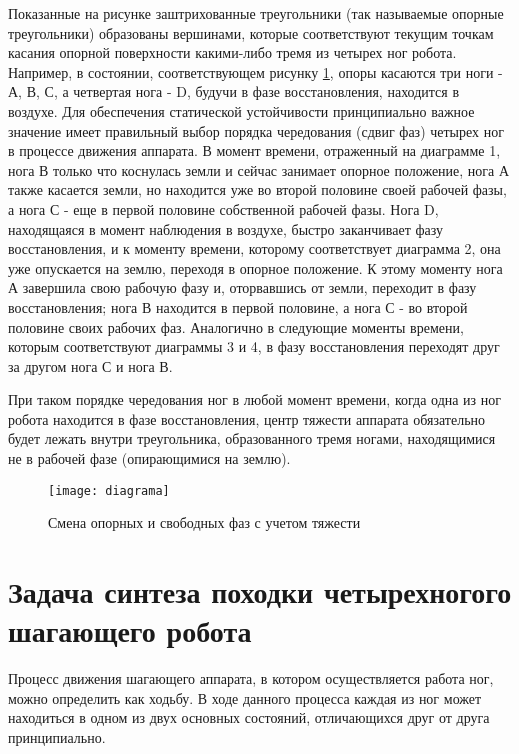 Показанные на рисунке заштрихованные треугольники (так называемые опорные треугольники) образованы вершинами, которые соответствуют текущим точкам касания опорной поверхности какими-либо тремя из четырех ног робота. Например, в состоянии, соответствующем рисунку \ref{diagrama}, опоры касаются три ноги - А, В, С, а четвертая нога - D, будучи в фазе восстановления, находится в воздухе. Для обеспечения статической устойчивости принципиально важное значение имеет правильный выбор порядка чередования (сдвиг фаз) четырех ног в процессе движения аппарата. В момент времени, отраженный на диаграмме 1, нога В только что коснулась земли и сейчас занимает опорное положение, нога А также касается земли, но находится уже во второй половине своей рабочей фазы, а нога С - еще в первой половине собственной рабочей фазы. Нога D, находящаяся в момент наблюдения в воздухе, быстро заканчивает фазу восстановления, и к моменту времени, которому соответствует диаграмма 2, она уже опускается на землю, переходя в опорное положение. К этому моменту нога А завершила свою рабочую фазу и, оторвавшись от земли, переходит в фазу восстановления; нога В находится в первой половине, а нога С - во второй половине своих рабочих фаз. Аналогично в следующие моменты времени, которым соответствуют диаграммы 3 и 4, в фазу восстановления переходят друг за другом нога С и нога В. 

При таком порядке чередования ног в любой момент времени, когда одна из ног робота находится в фазе восстановления, центр тяжести аппарата обязательно будет лежать внутри треугольника, образованного тремя ногами, находящимися не в рабочей фазе (опирающимися на землю).

\begin{figure}[h!]
	\begin{center}
		\texttt{[image: diagrama]}
		\caption{Смена опорных и свободных фаз с учетом тяжести}
		\label{diagrama}
	\end{center}
\end{figure}
\newpage
\section{Задача синтеза походки четырехногого шагающего робота}\label{C3_1}
Процесс движения шагающего аппарата, в котором осуществляется работа ног, можно определить как ходьбу. В ходе данного процесса каждая из ног может находиться в одном из двух основных состояний, отличающихся друг от друга принципиально.


